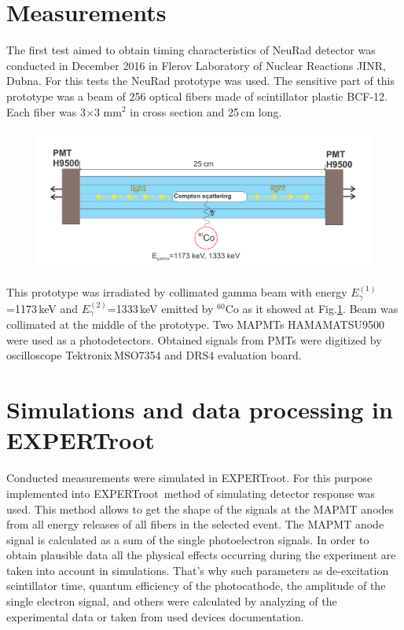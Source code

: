 \documentclass{webofc}
\newcommand{\er}{\textmd{EXPERTroot}}
\begin{document}
\section{Measurements}
The first test aimed to obtain timing characteristics of NeuRad detector was conducted in December 2016 in Flerov Laboratory of Nuclear Reactions JINR, Dubna. For this tests the NeuRad prototype was used. The sensitive part of this prototype was a beam of 256 optical fibers made of scintillator plastic BCF-12. Each fiber was  3$\times$3 mm$^2$ in cross section and 25\,cm long. 
\begin{figure}[h]
	\centering
	\includegraphics[width=1\linewidth]{NeuRadexperiment.png}
	\label{ris:neuradexp}
\end{figure}

This prototype was irradiated by collimated gamma beam with energy $E^{(1)}_{\gamma}$=1173\,keV and $E^{(2)}_{\gamma}$=1333\,keV emitted by $^{60}$Co as it showed at Fig.\ref{ris:neuradexp}. Beam was collimated at the middle of the prototype. Two MAPMTs HAMAMATSU9500 were used as a photodetectors. Obtained signals from PMTs were digitized by oscilloscope Tektronix\,MSO7354 and DRS4 evaluation board.
\section{Simulations and data processing in EXPERTroot}
Conducted measurements were simulated in \er. For this purpose implemented into \er\, method of simulating detector response was used.
This method allows to get the shape of the signals at the MAPMT anodes from all energy releases of all fibers in the selected event. The MAPMT anode signal is calculated as a sum of the single photoelectron signals. 
In order to obtain plausible data all the physical effects occurring during the experiment are taken into account in simulations.
That's why such parameters as de-excitation scintillator time, quantum efficiency of the photocathode, the amplitude of the single electron signal, and others were calculated by analyzing of the experimental data or taken from used devices documentation.
\end{document}
